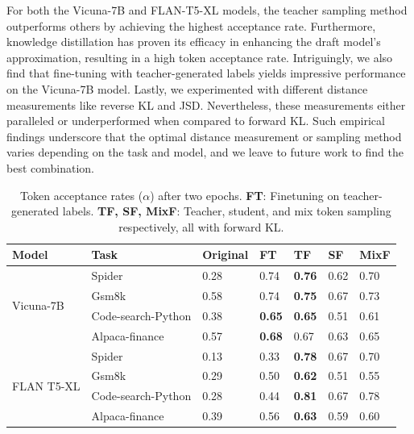 For both the Vicuna-7B and FLAN-T5-XL models, the teacher sampling method outperforms others by achieving the highest acceptance rate. 
Furthermore, knowledge distillation has proven its efficacy in enhancing the draft model's approximation, resulting in a high token acceptance rate. Intriguingly, we also find that fine-tuning with teacher-generated labels yields impressive performance on the Vicuna-7B model. 
Lastly, we experimented with different distance measurements like reverse KL and JSD. %
Nevertheless, these measurements 
either paralleled or underperformed when compared to forward KL. 
Such empirical findings underscore that the optimal distance measurement or 
sampling method varies depending on the task and model, and we leave to future work to find the best combination. 


\begin{table}
\begin{small}
\caption{Token acceptance rates ($\alpha$) after two epochs. 
{\bf FT}: Finetuning on teacher-generated labels. 
{\bf TF, SF, MixF}: Teacher, student, and mix token sampling respectively, all with forward KL. %
}
\label{tab:apha}
\begin{center}
\begin{tabular}{lllllll}
\toprule
{\bf Model}                 & {\bf Task}         &{\bf Original} & {\bf FT} & {\bf TF }   & {\bf SF }    & {\bf MixF}\\
\midrule
\multirow{4}{*}{Vicuna-7B}  & Spider             &  0.28    & 0.74     & {\bf 0.76}         & 0.62         & 0.70  \\
                            & Gsm8k              &  0.58    & 0.74     & {\bf 0.75}         & 0.67         & 0.73  \\
                            & Code-search-Python &  0.38    & {\bf 0.65}     & {\bf 0.65}         & 0.51         & 0.61  \\
                            & Alpaca-finance     &  0.57    & {\bf 0.68}     & 0.67         & 0.63         & 0.65  \\
\hline
\multirow{4}{*}{FLAN T5-XL} & Spider  &    0.13  &  0.33  & \textbf{0.78}         &      0.67    &  0.70 \\
                            & Gsm8k              &  0.29    &  0.50    & \textbf{0.62}         &   0.51      & 0.55  \\
                            & Code-search-Python &  0.28   &  0.44   & \textbf{0.81}         &    0.67      & 0.78 \\              
                            & Alpaca-finance     &   0.39   &  0.56   & \textbf{0.63}         &    0.59      & 0.60  \\
\bottomrule
\end{tabular}
\end{center}
\end{small}
\vspace{-20pt}
\end{table}



